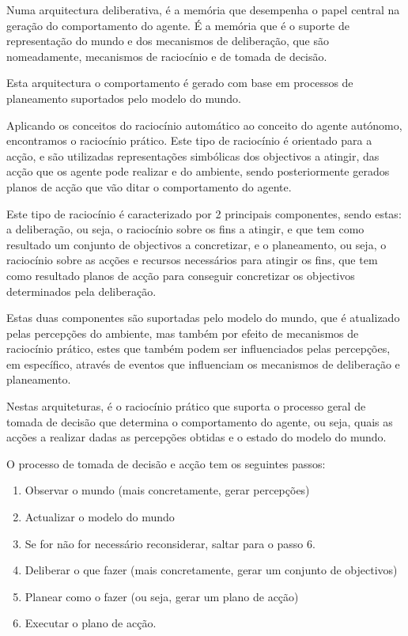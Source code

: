 \documentclass[a4paper,12pt]{article}
\begin{document}
Numa arquitectura deliberativa, é a memória que desempenha o papel central na geração do comportamento do agente. É a memória que é o suporte de representação do mundo e dos mecanismos de deliberação, que são nomeadamente, mecanismos de raciocínio e de tomada de decisão.

Esta arquitectura o comportamento é gerado com base em processos de planeamento suportados pelo modelo do mundo.

Aplicando os conceitos do raciocínio automático ao conceito do agente autónomo, encontramos o raciocínio prático. Este tipo de raciocínio é orientado para a acção, e são utilizadas representações simbólicas dos objectivos a atingir, das acção que os agente pode realizar e do ambiente, sendo posteriormente gerados planos de acção que vão ditar o comportamento do agente.

Este tipo de raciocínio é caracterizado por 2 principais componentes, sendo estas: a deliberação, ou seja, o raciocínio sobre os fins a atingir, e que tem como resultado um conjunto de objectivos a concretizar, e o planeamento, ou seja, o raciocínio sobre as acções e recursos necessários para atingir os fins, que tem como resultado planos de acção para conseguir concretizar os objectivos determinados pela deliberação.

Estas duas componentes são suportadas pelo modelo do mundo, que é atualizado pelas percepções do ambiente, mas também por efeito de mecanismos de raciocínio prático, estes que também podem ser influenciados pelas percepções, em específico, através de eventos que influenciam os mecanismos de deliberação e planeamento.

Nestas arquiteturas, é o raciocínio prático que suporta o processo geral de tomada de decisão que determina o comportamento do agente, ou seja, quais as acções a realizar dadas as percepções obtidas e o estado do modelo do mundo.

O processo de tomada de decisão e acção tem os seguintes passos:
\begin{enumerate}
	\item Observar o mundo (mais concretamente, gerar percepções)
	\item Actualizar o modelo do mundo
	\item Se for não for necessário reconsiderar, saltar para o passo 6.
	\item Deliberar o que fazer (mais concretamente, gerar um conjunto de objectivos)
	\item Planear como o fazer (ou seja, gerar um plano de acção)
	\item Executar o plano de acção.
\end{enumerate}
\end{document}
